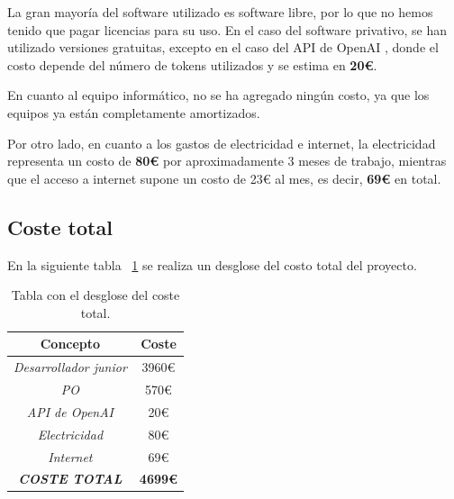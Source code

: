 La gran mayoría del software utilizado es software libre, por lo que no hemos tenido que pagar licencias para su uso. En el caso del software privativo, se han utilizado versiones gratuitas, excepto en el caso del \acrshort{API} de OpenAI \cite{APIOpenApi}, donde el costo depende del número de \gls{token}s utilizados y se estima en \textbf{20€}.

En cuanto al equipo informático, no se ha agregado ningún costo, ya que los equipos ya están completamente amortizados.

Por otro lado, en cuanto a los gastos de electricidad e internet, la electricidad representa un costo de \textbf{80€} por aproximadamente 3 meses de trabajo, mientras que el acceso a internet supone un costo de 23€ al mes, es decir, \textbf{69€} en total.


\subsection{Coste total}

En la siguiente tabla ~\ref{tab:Coste total proyecto}  se realiza un desglose del costo total del proyecto.

\begin{table}[hp!]
  \centering
  \begin{tabular}{c|c}
  \rowcolor{udcpink!25}
  \textbf{Concepto} & \textbf{Coste} \\\hline
  \textit{Desarrollador junior} & 3960€ \\
  \textit{\acrlong{PO}} & 570€ \\
  \textit{\acrshort{API} de OpenAI} & 20€ \\
  \textit{Electricidad} & 80€ \\
  \textit{Internet} & 69€ \\
  \textit{\textbf{COSTE TOTAL}} & \textbf{4699€} \\
  \end{tabular}
  \caption{Tabla con el desglose del coste total.}
  \label{tab:Coste total proyecto}
\end{table}